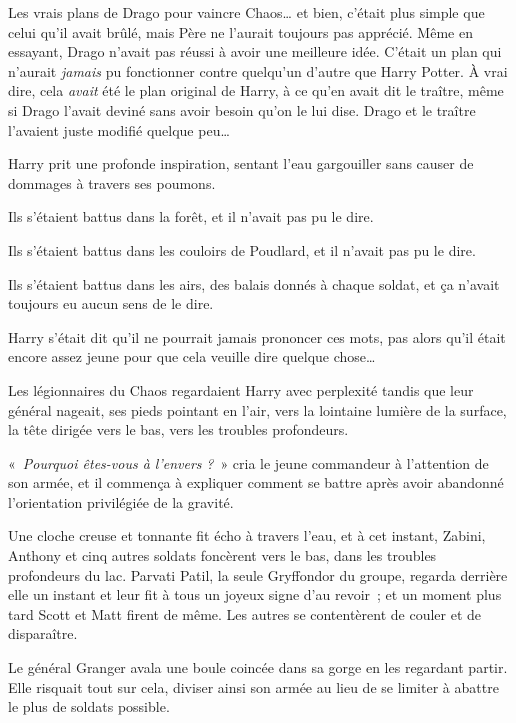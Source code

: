 Les vrais plans de Drago pour vaincre Chaos… et bien, c'était plus simple que celui qu'il avait brûlé, mais Père ne l'aurait toujours pas apprécié. Même en essayant, Drago n'avait pas réussi à avoir une meilleure idée. C'était un plan qui n'aurait \emph{jamais} pu fonctionner contre quelqu'un d'autre que Harry Potter. À vrai dire, cela \emph{avait} été le plan original de Harry, à ce qu'en avait dit le traître, même si Drago l'avait deviné sans avoir besoin qu'on le lui dise. Drago et le traître l'avaient juste modifié quelque peu…

\later

Harry prit une profonde inspiration, sentant l'eau gargouiller sans causer de dommages à travers ses poumons.

Ils s'étaient battus dans la forêt, et il n'avait pas pu le dire.

Ils s'étaient battus dans les couloirs de Poudlard, et il n'avait pas pu le dire.

Ils s'étaient battus dans les airs, des balais donnés à chaque soldat, et ça n'avait toujours eu aucun sens de le dire.

Harry s'était dit qu'il ne pourrait jamais prononcer ces mots, pas alors qu'il était encore assez jeune pour que cela veuille dire quelque chose…

Les légionnaires du Chaos regardaient Harry avec perplexité tandis que leur général nageait, ses pieds pointant en l'air, vers la lointaine lumière de la surface, la tête dirigée vers le bas, vers les troubles profondeurs.

«~\emph{Pourquoi êtes-vous à l'envers} \emph{?}~» cria le jeune commandeur à l'attention de son armée, et il commença à expliquer comment se battre après avoir abandonné l'orientation privilégiée de la gravité.

\later

Une cloche creuse et tonnante fit écho à travers l'eau, et à cet instant, Zabini, Anthony et cinq autres soldats foncèrent vers le bas, dans les troubles profondeurs du lac. Parvati Patil, la seule Gryffondor du groupe, regarda derrière elle un instant et leur fit à tous un joyeux signe d'au revoir~; et un moment plus tard Scott et Matt firent de même. Les autres se contentèrent de couler et de disparaître.

Le général Granger avala une boule coincée dans sa gorge en les regardant partir. Elle risquait tout sur cela, diviser ainsi son armée au lieu de se limiter à abattre le plus de soldats possible.

